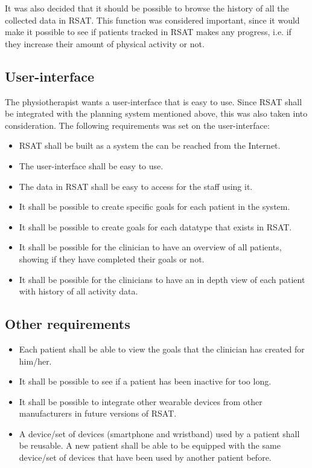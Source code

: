\documentclass{cslthse-msc}
\begin{document}
It was also decided that it should be possible to browse the history of all the collected data in RSAT. This function was considered important, since it would make it possible to see if patients tracked in RSAT makes any progress, i.e. if they increase their amount of physical activity or not. 

\subsection{User-interface}
The physiotherapist wants a user-interface that is easy to use. Since RSAT shall be integrated with the planning system mentioned above, this was also taken into consideration. The following requirements was set on the user-interface:

\begin{itemize}
    \item RSAT shall be built as a system the can be reached from the Internet.
    \item The user-interface shall be easy to use.
    \item The data in RSAT shall be easy to access for the staff using it.
    \item It shall be possible to create specific goals for each patient in the system.
    \item It shall be possible to create goals for each datatype that exists in RSAT.
    \item It shall be possible for the clinician to have an overview of all patients, showing if they have completed their goals or not. 

    \item It shall be possible for the clinicians to have an in depth view of each patient with history of all activity data.

\end{itemize}

\subsection{Other requirements}
\begin{itemize}
    \item Each patient shall be able to view the goals that the clinician has created for him/her.
    \item It shall be possible to see if a patient has been inactive for too long.
    \item It shall be possible to integrate other wearable devices from other manufacturers in future versions of RSAT.
    \item A device/set of devices (smartphone and wristband) used by a patient shall be reusable. A new patient shall be able to be equipped with the same device/set of devices that have been used by another patient before.
\end{itemize}
\end{document}
